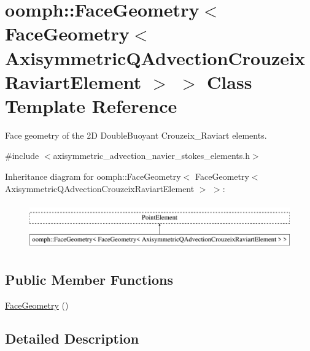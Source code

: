\hypertarget{classoomph_1_1FaceGeometry_3_01FaceGeometry_3_01AxisymmetricQAdvectionCrouzeixRaviartElement_01_4_01_4}{}\section{oomph\+:\+:Face\+Geometry$<$ Face\+Geometry$<$ Axisymmetric\+Q\+Advection\+Crouzeix\+Raviart\+Element $>$ $>$ Class Template Reference}
\label{classoomph_1_1FaceGeometry_3_01FaceGeometry_3_01AxisymmetricQAdvectionCrouzeixRaviartElement_01_4_01_4}


Face geometry of the 2D Double\+Buoyant Crouzeix\+\_\+\+Raviart elements.  




{\ttfamily \#include $<$axisymmetric\+\_\+advection\+\_\+navier\+\_\+stokes\+\_\+elements.\+h$>$}

Inheritance diagram for oomph\+:\+:Face\+Geometry$<$ Face\+Geometry$<$ Axisymmetric\+Q\+Advection\+Crouzeix\+Raviart\+Element $>$ $>$\+:\begin{figure}[H]
\begin{center}
\leavevmode
\includegraphics[height=2.000000cm]{classoomph_1_1FaceGeometry_3_01FaceGeometry_3_01AxisymmetricQAdvectionCrouzeixRaviartElement_01_4_01_4}
\end{center}
\end{figure}
\subsection*{Public Member Functions}
\begin{DoxyCompactItemize}
\item 
\hyperlink{classoomph_1_1FaceGeometry_3_01FaceGeometry_3_01AxisymmetricQAdvectionCrouzeixRaviartElement_01_4_01_4_a89552e00c39d62915ce157f8aaa8c0be}{Face\+Geometry} ()
\end{DoxyCompactItemize}


\subsection{Detailed Description}

